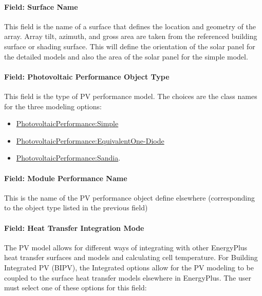 \paragraph{Field: Surface Name}\label{field-surface-name-001}

This field is the name of a surface that defines the location and geometry of the array. Array tilt, azimuth, and gross area are taken from the referenced building surface or shading surface. This will define the orientation of the solar panel for the detailed models and also the area of the solar panel for the simple model.

\paragraph{Field: Photovoltaic Performance Object Type}\label{field-photovoltaic-performance-object-type}

This field is the type of PV performance model. The choices are the class names for the three modeling options:

\begin{itemize}
\item
  \hyperref[photovoltaicperformancesimple]{PhotovoltaicPerformance:Simple}
\item
  \hyperref[photovoltaicperformanceequivalentone-diode]{PhotovoltaicPerformance:EquivalentOne-Diode}
\item
  \hyperref[photovoltaicperformancesandia]{PhotovoltaicPerformance:Sandia}.
\end{itemize}

\paragraph{Field: Module Performance Name}\label{field-module-performance-name}

This is the name of the PV performance object define elsewhere (corresponding to the object type listed in the previous field)

\paragraph{Field: Heat Transfer Integration Mode}\label{field-heat-transfer-integration-mode}

The PV model allows for different ways of integrating with other EnergyPlus heat transfer surfaces and models and calculating cell temperature. For Building Integrated PV (BIPV), the Integrated options allow for the PV modeling to be coupled to the surface heat transfer models elsewhere in EnergyPlus. The user must select one of these options for this field:

